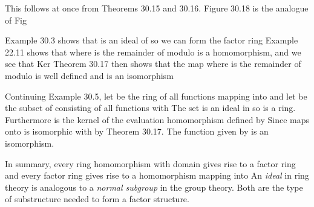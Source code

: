 \documentclass[11pt,oneside]{article}
\begin{document}
\begin{BookBody}

 This follows at once from Theorems 30.15 and 30.16. Figure 30.18 is the analogue of Fig\BookEnd{\blacklozenge}

 Example 30.3 shows that  is an ideal of  so we can form the factor ring  Example 22.11 shows that  where  is the remainder of  modulo  is a homomorphism, and we see that Ker Theorem 30.17 then shows that the map  where  is the remainder of  modulo  is well defined and is an isomorphism\BookEnd{\blacktriangle}

 Continuing Example 30.5, let  be the ring of all functions mapping  into  and let  be the subset of  consisting of all functions  with  The set  is an ideal in  so  is a ring. Furthermore is the kernel of the evaluation homomorphism  defined by  Since  maps onto  is isomorphic with  by Theorem 30.17. The function  given by  is an isomorphism. \BookEnd{\blacktriangle}

In summary, every ring homomorphism with domain  gives rise to a factor ring  and every factor ring  gives rise to a homomorphism mapping  into  An \textit{ideal} in ring theory is analogous to a\textit{ normal subgroup} in the group theory. Both are the type of substructure needed to form a factor structure.

\end{BookBody}

\BookNarrativefalse
\end{document}
